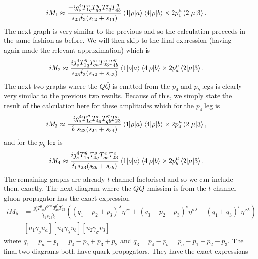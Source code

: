 \begin{equation}
iM_1 \approx  \frac{- i g_s^4 T^e_{1q}T^g_{qa}T^e_{23}T^g_{4b}}{s_{23} \hat{t}_3 (s_{12} + s_{13})} \mathinner{\langle1\vert\rho\vert a\rangle}_{} \mathinner{\langle4\vert\rho\vert b\rangle}_{} \times 2p_1^\mu \mathinner{\langle2\vert\mu\vert3\rangle}_{}.
\end{equation} 
The next graph is very similar to the previous and so the calculation proceeds in the same fashion as before. We will then skip to the final expression (having again made the relevant approximation) which is
\begin{equation}
iM_2 \approx \frac{ i g_s^4 T^g_{1q}T^e_{qa}T^e_{23}T^g_{4b}}{s_{23} \hat{t}_3 (s_{a2}+s_{a3})} \mathinner{\langle1\vert\rho\vert a\rangle}_{} \mathinner{\langle4\vert\rho\vert b\rangle}_{}\times 2p_a^\mu \mathinner{\langle2\vert\mu\vert3\rangle}_{}.
\end{equation}    
The next two graphs where the $Q \bar{Q}$ is emitted from the $p_4$ and $p_b$ legs is clearly very similar to the previous two results. Because of this, we simply state the result of the calculation here for these amplitudes which for the $p_4$ leg is
\begin{equation}
iM_3 \approx \frac{-i g_s^4 T^g_{1a} T^e_{4q}T^g_{qb}T^e_{23}}{\hat{t}_1 s_{23}(s_{24}+s_{34})}\mathinner{\langle1\vert\rho\vert a\rangle}_{} \mathinner{\langle4\vert\rho\vert b\rangle}_{} \times 2 p_4^\mu \mathinner{\langle2\vert\mu\vert3\rangle}_{},
\end{equation}
and for the $p_b$ leg is
\begin{equation}
iM_4 \approx \frac{i g_s^4 T^g_{1a} T^g_{4q} T^e_{qb} T^e_{23}}{\hat{t}_1 s_{23}(s_{2b}+s_{3b})} \mathinner{\langle1\vert\rho\vert a\rangle}_{} \mathinner{\langle4\vert\rho\vert b\rangle}_{} \times 2 p_b^\mu \mathinner{\langle2\vert\mu\vert3\rangle}_{}.
\end{equation}
The remaining graphs are already $t$-channel factorised and so we can include them exactly. The next diagram where the $Q \bar{Q}$ emission is from the $t$-channel gluon propagator has the exact expression
\begin{equation}
\begin{split}
iM_5 &= \frac{g_s^4 T^g_{1a} f^{geg'}T^{g'}_{4b}T^e_{23}}{\hat{t}_1 s_{23} \hat{t}_3} \left((q_1 + p_2 + p_3)^\lambda \eta^{\nu \sigma} + (q_3 - p_2 -p_3)^\nu \eta^{\sigma \lambda} - (q_1 + q_3)^\sigma \eta^{\nu \lambda} \right) \\
& \left[\bar{u}_1 \gamma_\nu u_a \right]  \left[\bar{u}_4 \gamma_\lambda u_b \right] \left[\bar{u}_2 \gamma_\sigma v_3 \right],
\end{split}
\end{equation}
where $q_1 = p_a - p_1 = p_4 - p_b + p_3 + p_2 $ and $q_3 = p_4 - p_b = p_a - p_1 - p_2 - p_3$. The final two diagrams both have quark propagators. They have the exact expressions
